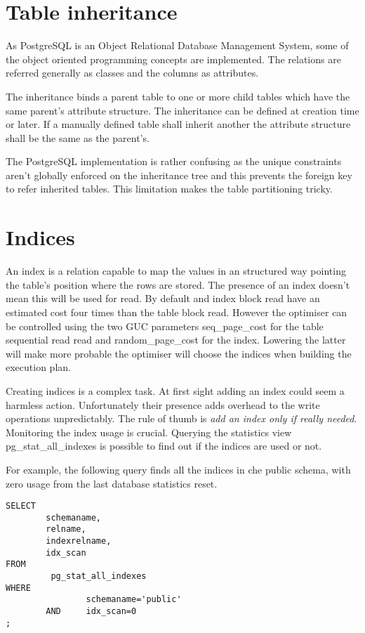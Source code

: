 \section{Table inheritance}
As PostgreSQL is an Object Relational Database Management System, some of the 
object oriented programming concepts are implemented. The relations are 
referred generally as classes and the columns as attributes. 

The inheritance binds a parent table to one or more child tables which have 
the same parent's attribute structure. The inheritance can be defined at 
creation time or later. If a manually defined table shall inherit another the 
attribute structure shall be the same as the parent's.

The PostgreSQL implementation is rather confusing as the unique constraints 
aren't globally enforced on the inheritance tree and this prevents the foreign 
key to refer inherited tables. This limitation makes the table 
partitioning tricky.

\section{Indices}
An index is a relation capable to map the values in an structured way pointing
the table's position where the rows are stored. The presence of an index 
doesn't mean this will be used for read. By default and index block read have 
an estimated cost four times than the table block read. However the optimiser
can be controlled using the two GUC parameters seq\_page\_cost for the table 
 sequential read read and random\_page\_cost for the index. Lowering the latter 
will make more probable the optimiser will choose the indices when building the 
execution plan.

Creating indices is a complex task. At first sight adding an index could seem a 
harmless action. Unfortunately their presence adds overhead to the write 
operations unpredictably. The rule of thumb is \textit{add an index only 
if really needed}. Monitoring the index usage is crucial. Querying the 
statistics view pg\_stat\_all\_indexes is possible to find out if the indices 
are used or not.

For example, the following query finds all the indices in che public 
schema, with zero usage from the last database statistics reset.

\begin{lstlisting}[style=pgsql]
SELECT
        schemaname,
        relname,
        indexrelname,
        idx_scan
FROM
         pg_stat_all_indexes
WHERE
                schemaname='public'
        AND     idx_scan=0
;


\end{lstlisting}



